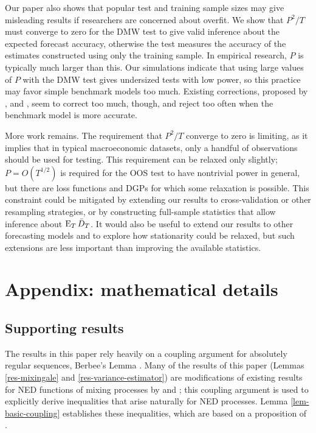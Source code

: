 \documentclass[11pt]{article}
\begin{document}
Our paper also shows that popular test and training sample sizes may
give misleading results if researchers are concerned about overfit.
We show that $P^2/T$ must converge to zero for the DMW test to give
valid inference about the expected forecast accuracy, otherwise the
test measures the accuracy of the estimates constructed using only the
training sample.  In empirical research, $P$ is typically much larger
than this.  Our simulations indicate that using large values of $P$
with the DMW test gives undersized tests with low power, so this
practice may favor simple benchmark models too much.  Existing
corrections, proposed by \citet{ClM:01,ClM:05}, \citet{Mcc:07} and
\citet{ClW:06,ClW:07}, seem to correct too much, though, and reject
too often when the benchmark model is more accurate.

More work remains.  The requirement that $P^2/T$ converge to zero is
limiting, as it implies that in typical macroeconomic datasets, only a
handful of observations should be used for testing.  This requirement
can be relaxed only slightly; $P = O(T^{1/2})$ is required for the
OOS test to have nontrivial power in general, but there are loss
functions and DGPs for which some relaxation is possible.  This
constraint could be mitigated by extending our results to
cross-validation or other resampling strategies, or by constructing
full-sample statistics that allow inference about $\operatorname{E}_T \bar{D}_T$.
It would also be useful to extend our results to other forecasting
models and to explore how stationarity could be relaxed, but such
extensions are less important than improving the available statistics.

\appendix
\section*{Appendix: mathematical details}
\setcounter{section}{1}
\setcounter{lem}{0}
\renewcommand{\thelem}{A\arabic{lem}}

\subsection*{Supporting results}
The results in this paper rely heavily on a coupling argument for
absolutely regular sequences, Berbee's Lemma \citep{Ber:79}.  Many of
the results of this paper (Lemmas \ref{res-mixingale} and
\ref{res-variance-estimator}) are modifications of existing results
for NED functions of mixing processes by \citet{Jon:97} and
\citet{JoD:00}; this coupling argument is used to explicitly derive
inequalities that arise naturally for NED processes.  Lemma
\ref{lem-basic-coupling} establishes these inequalities, which are
based on a proposition of \citet{MeP:02}.
\end{document}
